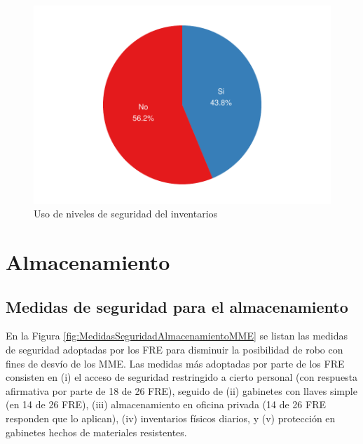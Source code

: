 \documentclass[
]{book}
\begin{document}
\begin{figure}
\includegraphics[width=0.85\linewidth]{InformeFinal_files/figure-latex/UsoNivelesSeguridad-1} \caption{Uso de niveles de seguridad del inventarios}\label{fig:UsoNivelesSeguridad}
\end{figure}

\hypertarget{almacenamiento}{%
\section{Almacenamiento}\label{almacenamiento}}

\hypertarget{medidas-de-seguridad-para-el-almacenamiento}{%
\subsection{Medidas de seguridad para el almacenamiento}\label{medidas-de-seguridad-para-el-almacenamiento}}


En la Figura \ref{fig:MedidasSeguridadAlmacenamientoMME} se listan las medidas de seguridad adoptadas por los FRE para disminuir la posibilidad de robo con fines de desvío de los MME. Las medidas más adoptadas por parte de los FRE consisten en (i) el acceso de seguridad restringido a cierto personal (con respuesta afirmativa por parte de 18 de 26 FRE), seguido de (ii) gabinetes con llaves simple (en 14 de 26 FRE), (iii) almacenamiento en oficina privada (14 de 26 FRE responden que lo aplican), (iv) inventarios físicos diarios, y (v) protección en gabinetes hechos de materiales resistentes.
\end{document}
